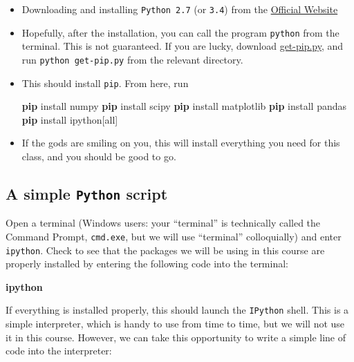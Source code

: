 \documentclass{article}
\newenvironment{Shaded}{}{}
\newcommand{\KeywordTok}[1]{\textcolor[rgb]{0.00,0.44,0.13}{\textbf{{#1}}}}
\newcommand{\NormalTok}[1]{{#1}}
\begin{document}
\begin{itemize}
\item
  Downloading and installing \texttt{Python 2.7} (or \texttt{3.4}) from
  the \href{https://www.python.org/downloads/}{Official Website}
\item
  Hopefully, after the installation, you can call the program
  \texttt{python} from the terminal. This is not guaranteed. If you are
  lucky, download
  \href{https://bootstrap.pypa.io/get-pip.py}{get-pip.py}, and run
  \texttt{python get-pip.py} from the relevant directory.
\item
  This should install \texttt{pip}. From here, run

\begin{Shaded}
\begin{Highlighting}[]
\KeywordTok{pip} \NormalTok{install numpy}
\KeywordTok{pip} \NormalTok{install scipy}
\KeywordTok{pip} \NormalTok{install matplotlib}
\KeywordTok{pip} \NormalTok{install pandas}
\KeywordTok{pip} \NormalTok{install ipython[all]}
\end{Highlighting}
\end{Shaded}
\item
  If the gods are smiling on you, this will install everything you need
  for this class, and you should be good to go.
\end{itemize}

    \subsection{A simple \texttt{Python}
script}\label{a-simple-python-script}

Open a terminal (Windows users: your ``terminal'' is technically called
the Command Prompt, \texttt{cmd.exe}, but we will use ``terminal''
colloquially) and enter \texttt{ipython}. Check to see that the packages
we will be using in this course are properly installed by entering the
following code into the terminal:

\begin{Shaded}
\begin{Highlighting}[]
\KeywordTok{ipython}
\end{Highlighting}
\end{Shaded}

If everything is installed properly, this should launch the
\texttt{IPython} shell. This is a simple interpreter, which is handy to
use from time to time, but we will not use it in this course. However,
we can take this opportunity to write a simple line of code into the
interpreter:
\end{document}
